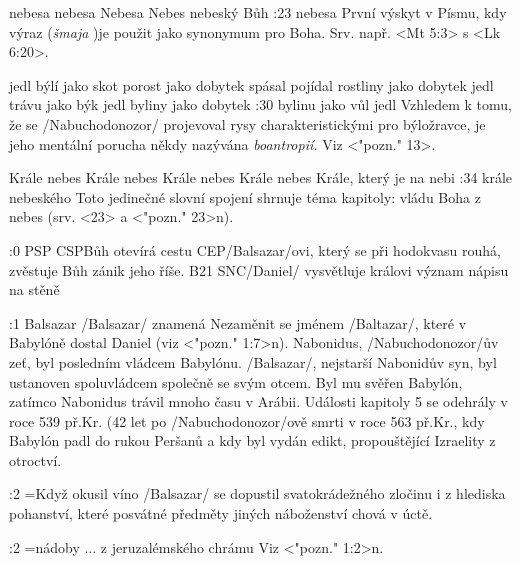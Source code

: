     {nebesa}   %
    {nebesa}   %
    {Nebesa}   %
    {Nebes}   %
    {nebeský Bůh}   %
:23 {nebesa}  První výskyt v Písmu, kdy výraz 
({\it šmaja\/} \Shamai)je použit jako synonymum pro Boha. Srv. např.  <Mt 5:3> s <Lk 6:20>.

    {jedl býlí jako skot}   %
    {porost jako dobytek spásal}   %
    {pojídal rostliny jako dobytek}   %
    {jedl trávu jako býk}   %
    {jedl byliny jako dobytek}   %
:30 {bylinu jako vůl jedl}
     Vzhledem k tomu, že  se \x/Nabuchodonozor/ projevoval rysy charakteristickými pro býložravce, je jeho mentální porucha někdy nazývána {\em boantropií.} Viz <"pozn." 13>.

    {Krále nebes}   %
    {Krále nebes}   %
    {Krále nebes}   %
    {Krále nebes}   %
    {Krále, který je na nebi}   %
:34 {krále nebeského} Toto jedinečné slovní spojení shrnuje téma kapitoly: vládu Boha z nebes (srv. <23> a <"pozn." 23>n). 

:0 {} 
% 
        {PSP}{}%
        {CSP}{Bůh otevírá cestu}%
        {CEP}{\x/Balsazar/ovi, který se při hodokvasu rouhá, zvěstuje Bůh
             zánik jeho říše.}%
        {B21}{}%
        {SNC}{\x/Daniel/ vysvětluje královi význam nápisu na stěně}%

             

:1 {Balsazar}
     \x/Balsazar/ znamená  
     Nezaměnit se jménem \x/Baltazar/, které v Babylóně dostal Daniel (viz <"pozn." 1:7>n). 
     Nabonidus, \x/Nabuchodonozor/ův zeť, byl posledním vládcem Babylónu. 
     \x/Balsazar/, nejstarší Nabonidův syn, byl ustanoven spoluvládcem společně se svým otcem.
     Byl mu svěřen Babylón, zatímco Nabonidus trávil mnoho času v Arábii.
     Události kapitoly 5 se odehrály v roce 539 př.Kr. (42 let po \x/Nabuchodonozor/ově
     smrti v roce 563 př.Kr., kdy Babylón padl do rukou Peršanů a kdy byl vydán
     edikt, propouštějící Izraelity z otroctví. 
     
     
:2 {}={Když okusil víno}  \x/Balsazar/ se dopustil svatokrádežného zločinu i z hlediska pohanství, které   posvátné předměty jiných náboženství chová v úctě.

:2 {}={nádoby ... z jeruzalémského chrámu} Viz  <"pozn." 1:2>n. 
     

